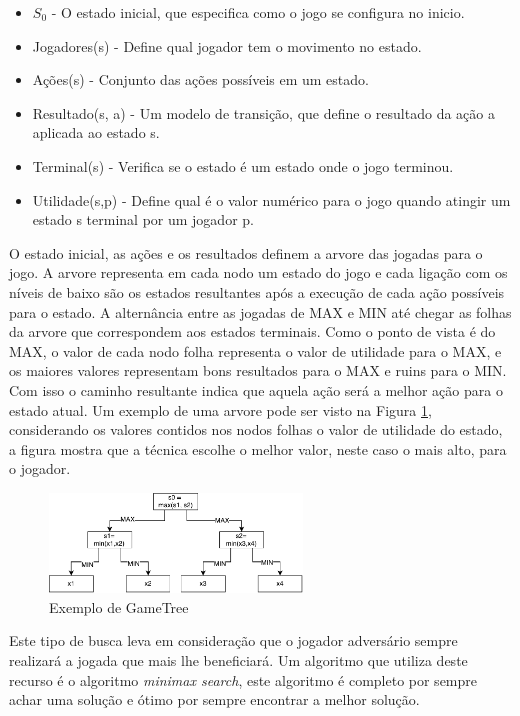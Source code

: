 \begin{itemize}
	\item $S_{0}$ - O estado inicial, que especifica como o jogo se configura no inicio.
	\item Jogadores(s) -  Define qual jogador tem o movimento no estado.
	\item Ações(s) - Conjunto das ações possíveis em um estado.
	\item Resultado(s, a) - Um modelo de transição, que define o resultado da ação a aplicada ao estado s.
	\item Terminal(s) - Verifica se o estado é um estado onde o jogo terminou.
	\item Utilidade(s,p) - Define qual é o valor numérico para o jogo quando atingir um estado s terminal por um jogador p. 
\end{itemize}

O estado inicial, as ações e os resultados definem a arvore das jogadas para o jogo. A arvore representa em cada nodo um estado do jogo e cada ligação com os níveis de baixo são os estados resultantes após a execução de cada ação possíveis para o estado. A alternância entre as jogadas de MAX e MIN até chegar as folhas da arvore que correspondem aos estados terminais. Como o ponto de vista é do MAX, o valor de cada nodo folha representa o valor de utilidade para o MAX, e os maiores valores representam bons resultados para o MAX e ruins para o MIN. Com isso o caminho resultante indica que aquela ação será a melhor ação para o estado atual. Um exemplo de uma arvore pode ser visto na Figura \ref{fig:gametree}, considerando os valores contidos nos nodos folhas o valor de utilidade do estado, a figura mostra que a técnica escolhe o melhor valor, neste caso o mais alto, para o jogador. 

\begin{figure}[ht]
	\centering
	\includegraphics[width=0.6\textwidth]{fig/gametree.pdf}
	\caption{Exemplo de GameTree}
	\label{fig:gametree}
\end{figure} 

Este tipo de busca leva em consideração que o jogador adversário sempre realizará a jogada que mais lhe beneficiará. Um algoritmo que utiliza deste recurso é o algoritmo \textit{minimax search}, este algoritmo é completo por sempre achar uma solução e ótimo por sempre encontrar a melhor solução.

